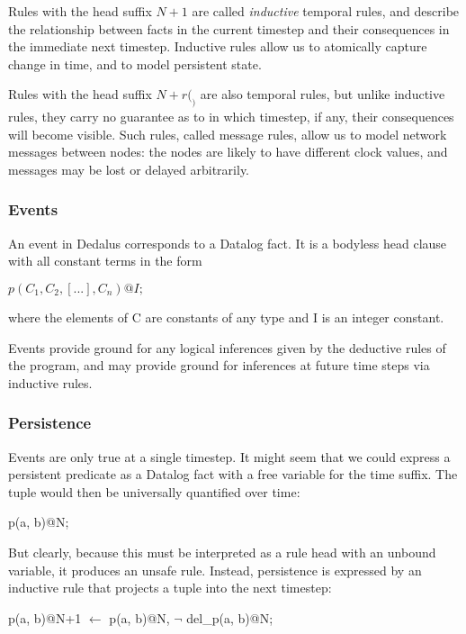 Rules with the head suffix $N + 1$ are called \emph{inductive} temporal rules, and describe the relationship between facts in the current timestep 
and their consequences in the immediate next timestep. Inductive rules allow us to atomically capture change in time, and to model persistent state.

Rules with the head suffix $N+r(_)$ are also temporal rules, but unlike inductive rules, they carry no guarantee as to in which timestep, if any, 
their consequences will become visible. Such rules, called message rules, allow us to model network messages between nodes: the nodes 
are likely to have different clock values, and messages may be lost or delayed arbitrarily.

\subsubsection{Events}

An event in Dedalus corresponds to a Datalog fact.  It is a bodyless head clause with all constant terms in the form


$p(C_{1},C_{2},[...],C_{n})@I;$


where the elements of C are constants of any type and I is an integer constant.

Events provide ground for any logical inferences given by the deductive rules of the program, and may provide ground for inferences at 
future time steps via inductive rules.

\subsubsection{Persistence}

Events are only true at a single timestep.  It might seem that we could express a persistent predicate as a Datalog fact with a free variable 
for the time suffix.  The tuple would then be universally quantified over time:

\begin{Dedalus}
p(a, b)@N;
\end{Dedalus}

But clearly, because this must be interpreted as a rule head with an unbound variable, it produces an unsafe rule.  Instead, persistence is
expressed by an inductive rule that projects a tuple into the next timestep:

\begin{Dedalus}
p(a, b)@N+1 \(\leftarrow\)
  p(a, b)@N, 
  \(\lnot\) del\_p(a, b)@N;
\end{Dedalus}


